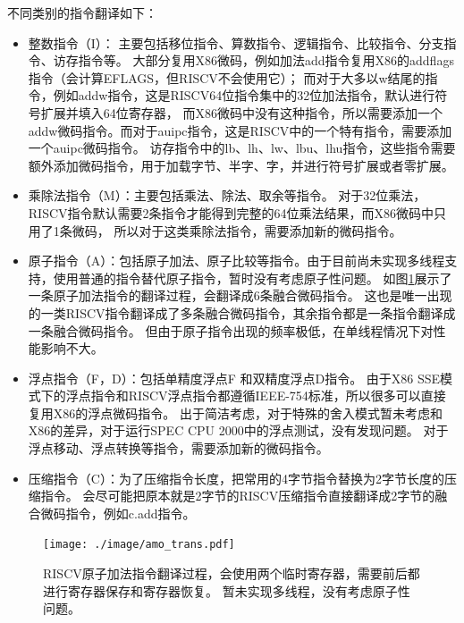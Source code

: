 不同类别的指令翻译如下：
\begin{itemize}
  \item 整数指令（I）： 主要包括移位指令、算数指令、逻辑指令、比较指令、分支指令、访存指令等。
          大部分复用X86微码，例如加法add指令复用X86的addflags指令（会计算EFLAGS，但RISCV不会使用它）；
          而对于大多以w结尾的指令，例如addw指令，这是RISCV64位指令集中的32位加法指令，默认进行符号扩展并填入64位寄存器，
          而X86微码中没有这种指令，所以需要添加一个addw微码指令。而对于auipc指令，这是RISCV中的一个特有指令，需要添加一个auipc微码指令。
          访存指令中的lb、lh、lw、lbu、lhu指令，这些指令需要额外添加微码指令，用于加载字节、半字、字，并进行符号扩展或者零扩展。

  \item 乘除法指令（M）：主要包括乘法、除法、取余等指令。
        对于32位乘法，RISCV指令默认需要2条指令才能得到完整的64位乘法结果，而X86微码中只用了1条微码，
        所以对于这类乘除法指令，需要添加新的微码指令。

  \item 原子指令（A）：包括原子加法、原子比较等指令。由于目前尚未实现多线程支持，使用普通的指令替代原子指令，暂时没有考虑原子性问题。
      如图\ref{img:amo_trans}展示了一条原子加法指令的翻译过程，会翻译成6条融合微码指令。
      这也是唯一出现的一类RISCV指令翻译成了多条融合微码指令，其余指令都是一条指令翻译成一条融合微码指令。
      但由于原子指令出现的频率极低，在单线程情况下对性能影响不大。

  \item 浮点指令（F，D）：包括单精度浮点F 和双精度浮点D指令。
        由于X86 SSE模式下的浮点指令和RISCV浮点指令都遵循IEEE-754标准，所以很多可以直接复用X86的浮点微码指令。
        出于简洁考虑，对于特殊的舍入模式暂未考虑和X86的差异，对于运行SPEC CPU 2000中的浮点测试，没有发现问题。
        对于浮点移动、浮点转换等指令，需要添加新的微码指令。

  \item 压缩指令（C）：为了压缩指令长度，把常用的4字节指令替换为2字节长度的压缩指令。
        会尽可能把原本就是2字节的RISCV压缩指令直接翻译成2字节的融合微码指令，例如c.add指令。

\end{itemize}

\begin{figure}[!htbp]
  \centering
  \texttt{[image: ./image/amo\_trans.pdf]}
  \caption{RISCV原子加法指令翻译过程，会使用两个临时寄存器，需要前后都进行寄存器保存和寄存器恢复。
  暂未实现多线程，没有考虑原子性问题。}
  \label{img:amo_trans}
\end{figure}

